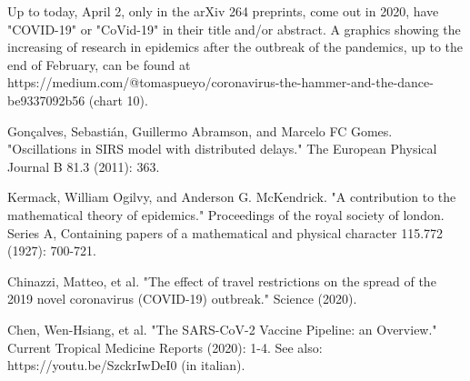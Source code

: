 \documentclass{article}
\begin{document}
\begin{thebibliography}{50}

Up to today, April 2, only in the arXiv 264 preprints, come out in 2020, have "COVID-19" or "CoVid-19" in their title and/or abstract. A graphics showing the increasing of research in epidemics after the outbreak of the pandemics, up to the end of February, can be found at
\newline https://medium.com/@tomaspueyo/coronavirus-the-hammer-and-the-dance-be9337092b56 (chart 10).

Gon\c{c}alves, Sebasti\'an, Guillermo Abramson, and Marcelo FC Gomes. "Oscillations in SIRS model with distributed delays." The European Physical Journal B 81.3 (2011): 363.

Kermack, William Ogilvy, and Anderson G. McKendrick. "A contribution to the mathematical theory of epidemics." Proceedings of the royal society of london. Series A, Containing papers of a mathematical and physical character 115.772 (1927): 700-721.

Chinazzi, Matteo, et al. "The effect of travel restrictions on the spread of the 2019 novel coronavirus (COVID-19) outbreak." Science (2020).

Chen, Wen-Hsiang, et al. "The SARS-CoV-2 Vaccine Pipeline: an Overview." Current Tropical Medicine Reports (2020): 1-4. See also: https://youtu.be/SzckrIwDeI0 (in italian).

\end{thebibliography}
\end{document}
